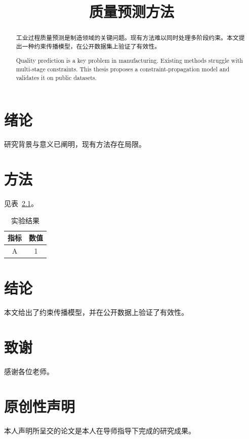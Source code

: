 \documentclass{generic}
\title{质量预测方法}
\begin{document}
\begin{abstract}
工业过程质量预测是制造领域的关键问题。现有方法难以同时处理多阶段约束。本文提出一种约束传播模型，在公开数据集上验证了有效性。
\end{abstract}
\begin{abstract}
Quality prediction is a key problem in manufacturing. Existing methods struggle with multi-stage constraints. This thesis proposes a constraint-propagation model and validates it on public datasets.
\end{abstract}
\chapter{绪论}
研究背景与意义已阐明，现有方法存在局限。
\chapter{方法}
见表~\ref{tab:good}。
\begin{table}[htbp]
\caption{实验结果}
\label{tab:good}
\begin{tabular}{cc}
\toprule
指标 & 数值 \\
\midrule
A & 1 \\
\bottomrule
\end{tabular}
\end{table}
\chapter{结论}
本文给出了约束传播模型，并在公开数据上验证了有效性。
\chapter{致谢}
感谢各位老师。
\chapter{原创性声明}
本人声明所呈交的论文是本人在导师指导下完成的研究成果。

\end{document}
